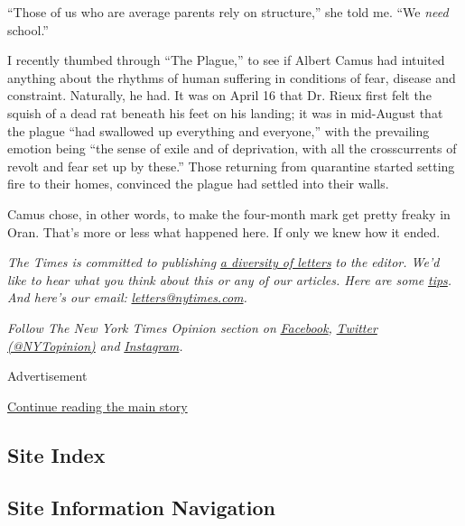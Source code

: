 ``Those of us who are average parents rely on structure,'' she told me.
``We \emph{need} school.''

I recently thumbed through ``The Plague,'' to see if Albert Camus had
intuited anything about the rhythms of human suffering in conditions of
fear, disease and constraint. Naturally, he had. It was on April 16 that
Dr. Rieux first felt the squish of a dead rat beneath his feet on his
landing; it was in mid-August that the plague ``had swallowed up
everything and everyone,'' with the prevailing emotion being ``the sense
of exile and of deprivation, with all the crosscurrents of revolt and
fear set up by these.'' Those returning from quarantine started setting
fire to their homes, convinced the plague had settled into their walls.

Camus chose, in other words, to make the four-month mark get pretty
freaky in Oran. That's more or less what happened here. If only we knew
how it ended.

\emph{The Times is committed to publishing}
\href{https://www.nytimes.com/2019/01/31/opinion/letters/letters-to-editor-new-york-times-women.html}{\emph{a
diversity of letters}} \emph{to the editor. We'd like to hear what you
think about this or any of our articles. Here are some}
\href{https://help.nytimes.com/hc/en-us/articles/115014925288-How-to-submit-a-letter-to-the-editor}{\emph{tips}}\emph{.
And here's our email:}
\href{mailto:letters@nytimes.com}{\emph{letters@nytimes.com}}\emph{.}

\emph{Follow The New York Times Opinion section on}
\href{https://www.facebook.com/nytopinion}{\emph{Facebook}}\emph{,}
\href{http://twitter.com/NYTOpinion}{\emph{Twitter (@NYTopinion)}}
\emph{and}
\href{https://www.instagram.com/nytopinion/}{\emph{Instagram}}\emph{.}

Advertisement

\protect\hyperlink{after-bottom}{Continue reading the main story}

\hypertarget{site-index}{%
\subsection{Site Index}\label{site-index}}

\hypertarget{site-information-navigation}{%
\subsection{Site Information
Navigation}\label{site-information-navigation}}

